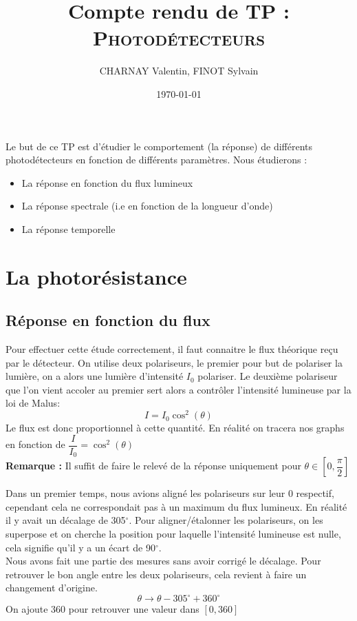 \documentclass[12pt,a4paper]{article}
\author{CHARNAY Valentin, FINOT Sylvain}
\title{Compte rendu de TP :\\[4pt] \scshape Photodétecteurs}
\date{\today}
\begin{document}
	\maketitle
	Le but de ce TP est d'étudier le comportement (la réponse) de différents photodétecteurs en fonction de différents paramètres. Nous étudierons :
	\begin{itemize}
		\item La réponse en fonction du flux lumineux
		\item La réponse spectrale (i.e en fonction de la longueur d'onde)
		\item La réponse temporelle
	\end{itemize}
	
	\section{La photorésistance}
	\subsection{Réponse en fonction du flux}
	Pour effectuer cette étude correctement, il faut connaitre le flux théorique reçu par le détecteur.
	On utilise deux polariseurs, le premier pour but de polariser la lumière, on a alors une lumière d'intensité $I_0$ polariser. Le deuxième polariseur que l'on vient accoler au premier sert alors a contrôler l'intensité lumineuse par la loi de Malus:
	$$I=I_0\cos^2(\theta)$$
	Le flux est donc proportionnel à cette quantité. En réalité on tracera nos graphs en fonction de $\dfrac{I}{I_0}=\cos^2(\theta)$\\
	\textbf{Remarque :} Il suffit de faire le relevé de la réponse uniquement pour $\theta \in \left[0,\dfrac{\pi}{2} \right]$
	
	Dans un premier temps, nous avions aligné les polariseurs sur leur 0 respectif, cependant cela ne correspondait pas à un maximum du flux lumineux. En réalité il y avait un décalage de 305$^{\circ}$.
	Pour aligner/étalonner les polariseurs, on les superpose et on cherche la position pour laquelle l'intensité lumineuse est nulle, cela signifie qu'il y a un écart de 90$^\circ$.\\
	Nous avons fait une partie des mesures sans avoir corrigé le décalage. Pour retrouver le bon angle entre les deux polariseurs, cela revient à faire un changement d'origine.
	$$\theta \rightarrow \theta -305^{\circ} +360^{\circ}$$
	On ajoute 360 pour retrouver une valeur dans $\left[0,360\right]$
	
\end{document}
